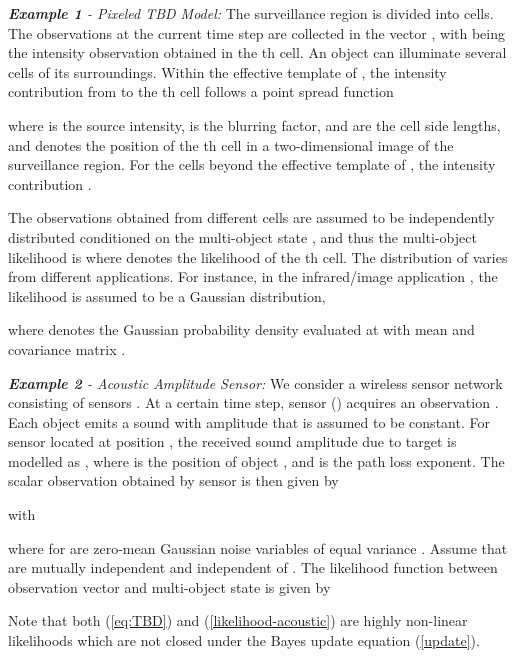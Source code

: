 \documentclass[journal]{IEEEtran}
\begin{document}
{\noindent \textit{\textbf{Example 1} - Pixeled TBD Model: }
The surveillance
region is divided into  cells. The observations at the current time step  are collected in
the vector , with  being the intensity
observation obtained in the th cell. An object  can  illuminate several cells of its surroundings.
Within the effective template of ,
   the intensity contribution from  to the th cell follows a point spread function \cite{refr:beyond_kalm_filer}  

  where  is the source intensity,  is the blurring factor,  and  are the cell side lengths, and  denotes the position of the th cell in a two-dimensional image of the surveillance region.  For the cells beyond the  effective template of , the intensity contribution .
  
 The  observations obtained from different cells
are assumed to be independently distributed conditioned on the multi-object state , and thus the multi-object likelihood is
where  denotes the likelihood of the th cell.
The distribution of  varies from different applications. For instance, in the infrared/image application  
\cite{refr:MeMber_filter,refr:beyond_kalm_filer}, 
the likelihood  is assumed to be a Gaussian distribution, 

where  denotes the Gaussian probability density
evaluated at  with mean  and covariance matrix .
  


\noindent \textit{\textbf{Example 2} - Acoustic Amplitude Sensor:}
We consider a wireless sensor network consisting of  sensors \cite{refr:amplitude}. At a certain time step,   sensor  () acquires an observation . 
Each object   emits a sound with amplitude  that is assumed to be constant. For  sensor  located at  position , the received sound amplitude due to 
target  is modelled as , where    is the position of object ,  and  is the path loss exponent. The scalar observation  obtained by sensor   is then given by

with

where  for  are zero-mean Gaussian  noise variables of equal variance . Assume that  are mutually independent and independent of . The likelihood function  between  observation vector  and  multi-object state  is given by






Note that both (\ref{eq:TBD}) and  (\ref{likelihood-acoustic}) are highly non-linear likelihoods which are not closed under the Bayes  update equation (\ref{update}).




}
\end{document}

